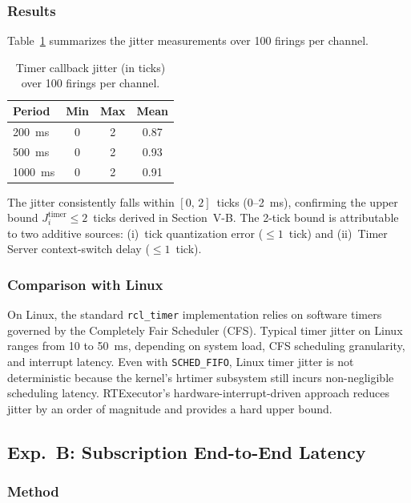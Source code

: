 \subsubsection{Results}

Table~\ref{tab:jitter} summarizes the jitter measurements over 100 firings per channel.

\begin{table}[t]
\centering
\caption{Timer callback jitter (in ticks) over 100 firings per channel.}
\label{tab:jitter}
\begin{tabular}{lccc}
\hline
\textbf{Period} & \textbf{Min} & \textbf{Max} & \textbf{Mean} \\
\hline
200~ms  & 0 & 2 & 0.87 \\
500~ms  & 0 & 2 & 0.93 \\
1000~ms & 0 & 2 & 0.91 \\
\hline
\end{tabular}
\end{table}

The jitter consistently falls within $[0,\,2]$~ticks (0--2~ms), confirming the upper bound $J_i^{\mathrm{timer}} \leqslant 2$~ticks derived in Section~V-B.
The 2-tick bound is attributable to two additive sources: (i)~tick quantization error ($\leqslant 1$~tick) and (ii)~Timer Server context-switch delay ($\leqslant 1$~tick).

\subsubsection{Comparison with Linux}

On Linux, the standard \texttt{rcl\_timer} implementation relies on software timers governed by the Completely Fair Scheduler (CFS).
Typical timer jitter on Linux ranges from 10 to 50~ms, depending on system load, CFS scheduling granularity, and interrupt latency.
Even with \texttt{SCHED\_FIFO}, Linux timer jitter is not deterministic because the kernel's hrtimer subsystem still incurs non-negligible scheduling latency.
RTExecutor's hardware-interrupt-driven approach reduces jitter by an order of magnitude and provides a hard upper bound.

\subsection{Exp.\ B: Subscription End-to-End Latency}

\subsubsection{Method}

